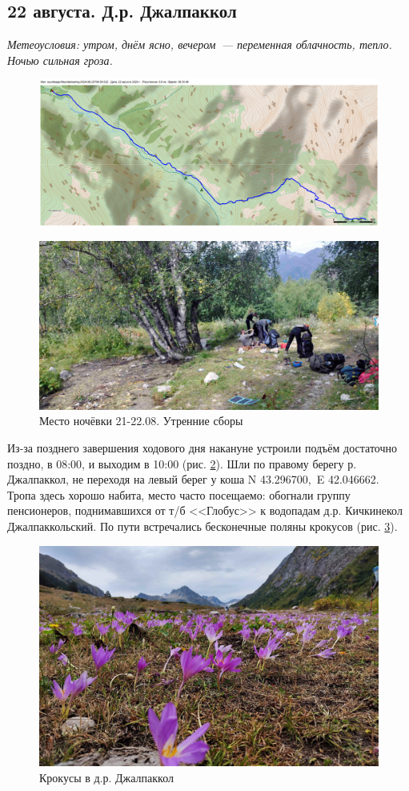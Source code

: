 \subsection{22 августа. Д.р. Джалпаккол}
\textit{Метеоусловия: утром, днём ясно, вечером~--- переменная облачность, тепло. Ночью сильная гроза.}

\begin{figure}[h!]
	\centering
	\includegraphics[angle=0, width=0.7\linewidth]{../pics/mini_maps/22}
	\label{fig:mini_22}
\end{figure}


\begin{figure}[h!]
	\centering
	\includegraphics[width=0.7\linewidth]{../pics/DSC_1181}
	\caption{Место ночёвки 21-22.08. Утренние сборы}
	\label{fig:DSC_1181}
\end{figure}


Из-за позднего завершения ходового дня накануне устроили подъём достаточно поздно, в 08:00, и выходим в 10:00 (рис. \ref{fig:DSC_1181}). Шли по правому берегу р. Джалпаккол, не переходя на левый берег у коша N 43.296700\degree,~E 42.046662\degree. Тропа здесь хорошо набита, место часто посещаемо: обогнали группу пенсионеров, поднимавшихся от т/б <<Глобус>> к водопадам д.р. Кичкинекол Джалпаккольский. По пути встречались бесконечные поляны крокусов (рис. \ref{fig:IMG_20240822_101505}).

\begin{figure}[h!]
	\centering
	\includegraphics[width=0.7\linewidth]{../pics/IMG_20240822_101505}
	\caption{Крокусы в д.р. Джалпаккол}
	\label{fig:IMG_20240822_101505}
\end{figure}

